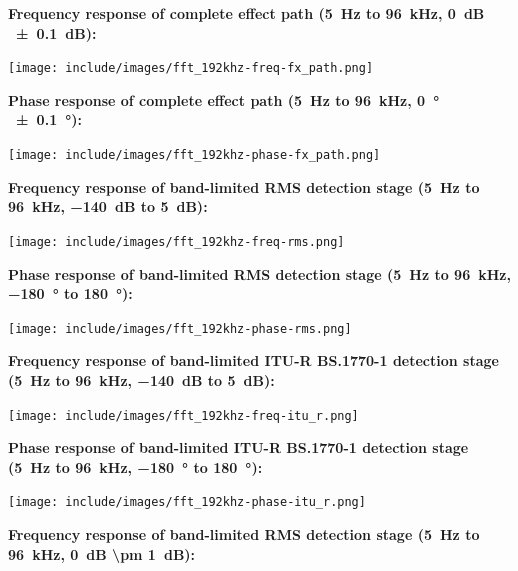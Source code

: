 \textbf{Frequency response of complete effect path (\SI{5}{\hertz} to
  \SI{96}{\kilo\hertz}, \SI{0}{\dB} \SI{\pm 0.1}{\dB}):}

\begin{center}
  \texttt{[image: include/images/fft\_192khz-freq-fx\_path.png]}
\end{center}

\textbf{Phase response of complete effect path (\SI{5}{\hertz} to
  \SI{96}{\kilo\hertz}, \SI{0}{\degree}\,\SI{\pm 0.1}{\degree}):}

\begin{center}
  \texttt{[image: include/images/fft\_192khz-phase-fx\_path.png]}
\end{center}

\newpage %

\textbf{Frequency response of band-limited RMS detection stage
  (\SI{5}{\hertz} to \SI{96}{\kilo\hertz}, \SI{-140}{\dB} to
  \SI{5}{\dB}):}

\begin{center}
  \texttt{[image: include/images/fft\_192khz-freq-rms.png]}
\end{center}

\textbf{Phase response of band-limited RMS detection stage
  (\SI{5}{\hertz} to \SI{96}{\kilo\hertz}, \SI{-180}{\degree} to
  \SI[addsign]{+180}{\degree}):}

\begin{center}
  \texttt{[image: include/images/fft\_192khz-phase-rms.png]}
\end{center}
\newpage %

\textbf{Frequency response of band-limited ITU-R BS.1770-1 detection stage
  (\SI{5}{\hertz} to \SI{96}{\kilo\hertz}, \SI{-140}{\dB} to
  \SI{5}{\dB}):}

\begin{center}
  \texttt{[image: include/images/fft\_192khz-freq-itu\_r.png]}
\end{center}

\textbf{Phase response of band-limited ITU-R BS.1770-1 detection stage
  (\SI{5}{\hertz} to \SI{96}{\kilo\hertz}, \SI{-180}{\degree} to
  \SI[addsign]{+180}{\degree}):}

\begin{center}
  \texttt{[image: include/images/fft\_192khz-phase-itu\_r.png]}
\end{center}

\newpage %

\textbf{Frequency response of band-limited RMS detection stage
  (\SI{5}{\hertz} to \SI{96}{\kilo\hertz}, \SI{0}{\dB} \SI{\pm
    1}{\dB}):}

